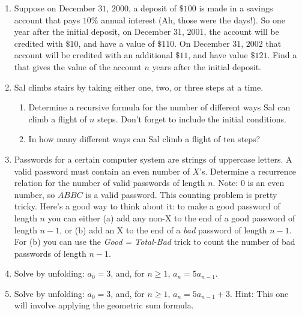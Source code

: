 \documentclass[11pt]{amsart}
\begin{document}
\begin{enumerate}

\item     Suppose on December $31$, $2000$, a deposit of $\$100$ is made in a savings 
account that pays $10\%$ annual interest (Ah, those were the days!). 
So one year after the initial deposit, on  December $31$, $2001$, the account
will be credited with $\$10$, and have a value of $\$110$. On  December $31$, $2002$
that account will be credited with an additional $\$11$, and have value $\$121$.
Find a  that gives the value of the account $n$ years after the
initial deposit.\\[5pt]

\item Sal climbs stairs by taking either one, two, or three steps at a time.\\[3pt]
  \begin{enumerate}
\item Determine a recursive formula for the number of different ways Sal can climb a
flight of $n$ steps. Don't forget to include the initial conditions. \\[3pt]

\item In how many different ways can Sal climb a flight of ten steps?\\[5pt]
\end{enumerate}

\item  Passwords for a certain computer system are strings of uppercase letters.
A valid password must contain an even number of $X$'s. Determine a recurrence
relation for the number of valid passwords of length $n$.
Note: $0$ is an even number, so $ABBC$ is a valid password. This counting problem is pretty tricky. Here's a good way to think about it: to make a good password of length $n$
you can either (a) add any non-X to the end of a  good password of length $n-1$, or (b) add an X to the end of a {\it bad} password of length $n-1$. For (b) you can use the {\it Good = Total-Bad} trick to count the number of bad passwords of length $n-1$.\\[5pt]
 
 \item  Solve by unfolding: $a_0 = 3$, and, for $n\geq 1$, $a_n = 5a_{n-1}$.\\[5pt]


\item  Solve by unfolding:  $a_0 = 3$, and, for $n\geq 1$,  $a_n = 5a_{n-1}+ 3$.
Hint: This one will involve applying the  geometric sum formula.\\[5pt]



\end{enumerate}
\end{document}
